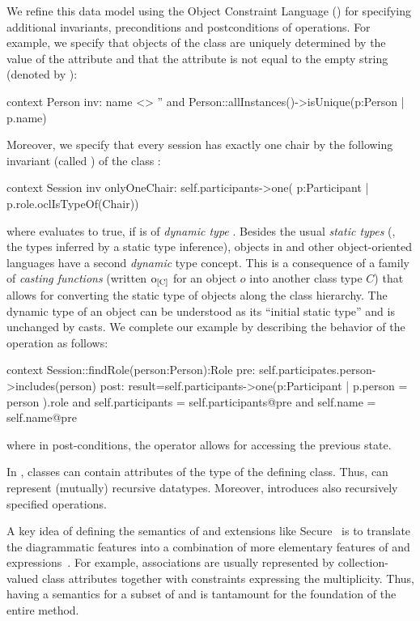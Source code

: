 We refine this data model using the Object Constraint Language (\OCL)
for specifying additional invariants, preconditions and postconditions
of operations. For example, we specify that objects of the class
 are uniquely determined by the value of the
 attribute and that the attribute  is
not equal to the empty string (denoted by ):
\begin{ocl}
context Person
  inv: name <> '' and
       Person::allInstances()->isUnique(p:Person | p.name)
\end{ocl}
Moreover, we specify that every session has exactly one chair by the
following invariant (called ) of the class
:
\begin{ocl}
context Session
  inv onlyOneChair: self.participants->one( p:Participant |
                                      p.role.oclIsTypeOf(Chair))
\end{ocl}
where  evaluates to true, if
 is of \emph{dynamic type}
. Besides the usual \emph{static types} (\ie, the
types inferred by a static type inference), objects in \UML and other
object-oriented languages have a second \emph{dynamic} type concept.
This is a consequence of a family of \emph{casting functions} (written
$\typeCast{o}{C}$ for an object $o$ into another class type $C$) that
allows for converting the static type of objects along the class
hierarchy. The dynamic type of an object can be understood as its
``initial static type'' and is unchanged by casts. We complete our
example by describing the behavior of the operation
 as follows:
\begin{ocl}
context Session::findRole(person:Person):Role
  pre:  self.participates.person->includes(person)
  post: result=self.participants->one(p:Participant |
                                p.person = person ).role
        and self.participants = self.participants@pre
        and self.name = self.name@pre
\end{ocl}
where in post-conditions, the operator  allows for
accessing the previous state.

In \UML, classes can contain attributes of the type of the
defining class.  Thus, \UML can represent (mutually) recursive
datatypes. Moreover, \OCL introduces also recursively specified
operations.

A key idea of defining the semantics of \UML and extensions like
Secure\UML~\cite{brucker.ea:transformation:2006} is to translate the
diagrammatic \UML features into a combination of more elementary
features of \UML and \OCL
expressions~\cite{gogolla.ea:expressing:2001}. For example,
associations are usually represented by collection-valued class
attributes together with \OCL constraints expressing the
multiplicity. Thus, having a semantics for a subset of \UML and \OCL is
tantamount for the foundation of the entire method.



